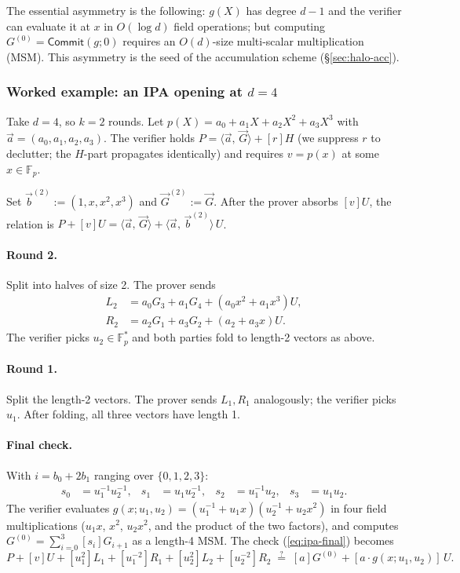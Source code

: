 \documentclass[11pt,a4paper]{article}
\theoremstyle{definition}
\newcommand{\F}{\mathbb{F}}
\newcommand{\ip}[2]{\langle #1,\, #2 \rangle}
\newcommand{\Comm}{\mathsf{Commit}}
\begin{document}
The essential asymmetry is the following: $g(X)$ has degree $d - 1$ and the verifier can evaluate
it at $x$ in $O(\log d)$ field operations; but computing
$G^{(0)} = \Comm(g; 0)$ requires an $O(d)$-size multi-scalar
multiplication (MSM). This asymmetry is the seed of the accumulation
scheme (\S\ref{sec:halo-acc}).

\subsubsection{Worked example: an IPA opening at \texorpdfstring{$d = 4$}{d=4}}\label{sec:ipa-worked}

Take $d = 4$, so $k = 2$ rounds. Let $p(X) = a_0 + a_1 X + a_2 X^2 + a_3 X^3$
with $\vec{a} = (a_0, a_1, a_2, a_3)$. The verifier holds
$P = \ip{\vec{a}}{\vec{G}} + [r] H$ (we suppress $r$ to declutter; the
$H$-part propagates identically) and requires $v = p(x)$ at some $x \in \F_p$.

Set $\vec{b}^{(2)} := (1, x, x^2, x^3)$ and $\vec{G}^{(2)} := \vec{G}$.
After the prover absorbs $[v] U$, the relation is
$P + [v] U = \ip{\vec{a}}{\vec{G}} + \ip{\vec{a}}{\vec{b}^{(2)}}\,U$.

\paragraph{Round 2.} Split into halves of size 2. The prover sends
\begin{align*}
L_2 &= a_0 G_3 + a_1 G_4 + (a_0 x^2 + a_1 x^3) U,\\
R_2 &= a_2 G_1 + a_3 G_2 + (a_2 + a_3 x) U.
\end{align*}
The verifier picks $u_2 \in \F_p^*$ and both parties fold to length-2
vectors as above.

\paragraph{Round 1.} Split the length-2 vectors. The prover sends $L_1,
R_1$ analogously; the verifier picks $u_1$. After folding, all three vectors
have length 1.

\paragraph{Final check.} With $i = b_0 + 2 b_1$ ranging over
$\{0, 1, 2, 3\}$:
\begin{align*}
s_0 &= u_1^{-1} u_2^{-1}, & s_1 &= u_1 u_2^{-1}, & s_2 &= u_1^{-1} u_2, & s_3 &= u_1 u_2.
\end{align*}
The verifier evaluates
$g(x; u_1, u_2) = (u_1^{-1} + u_1 x)(u_2^{-1} + u_2 x^2)$ in four
field multiplications ($u_1 x$, $x^2$, $u_2 x^2$, and the product of the
two factors), and computes
$G^{(0)} = \sum_{i=0}^{3} [s_i] G_{i+1}$ as a length-4 MSM. The check
(\ref{eq:ipa-final}) becomes
\[
P + [v] U + [u_1^2] L_1 + [u_1^{-2}] R_1 + [u_2^2] L_2 + [u_2^{-2}] R_2
\;\stackrel{?}{=}\; [a] G^{(0)} + [a \cdot g(x; u_1, u_2)]\,U.
\]
\end{document}
